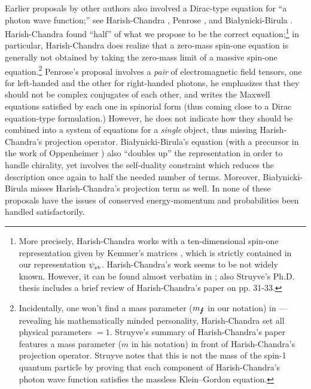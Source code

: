\documentclass[12pt]{article}
\theoremstyle{definition}
\numberwithin{equation}{section}
\newcommand{\psiPH}{{\psi_{\mbox{\rm\tiny ph}}}}
\newcommand{\mPH}{{m_{\mbox{\Lightning}}}}
\begin{document}
 Earlier proposals by other authors also involved a Dirac-type equation for ``a photon wave function;'' 
see Harish-Chandra \cite{HC1946}, Penrose \cite{Pen1976}, and Bia{\l}ynicki-Birula \cite{BiBiTHREE,IBBphotonREV}. 
 Harish-Chandra \cite{HC1946} found ``half'' of what we propose to be the correct equation;\footnote{More precisely, 
  Harish-Chandra works with a ten-dimensional spin-one representation given by Kemmer's matrices \cite{Kem1939}, 
  which is strictly contained in our representation $\psiPH$.
  Harish-Chandra's work seems to be not widely known.
  However, it can be found almost verbatim in \cite{Cor1953};
  also Struyve's Ph.D. thesis \cite{StruyvePHD} includes a brief review of Harish-Chandra's paper on pp. 31-33.}
in particular, Harish-Chandra does realize that a zero-mass spin-one equation is generally not obtained by taking the zero-mass limit of
a massive spin-one equation.\footnote{\label{fn:mzapp}Incidentally, one won't find a mass parameter ($\mPH$ in our notation) in \cite{HC1946} --- 
revealing his mathematically minded personality, Harish-Chandra set all physical parameters $=1$. 
  Struyve's summary of Harish-Chandra's paper features a mass parameter ($m$ in his notation) in front of Harish-Chandra's projection operator.
  Struyve notes that this is not the mass of the spin-1 quantum particle by proving that each component of Harish-Chandra's photon wave function 
 satisfies the massless Klein--Gordon equation.}
Penrose's proposal \cite{Pen1976} involves a {\em pair} of electromagnetic field tensors, one for left-handed and the other 
for right-handed photons, he emphasizes that they should not be complex conjugates of each other, and writes the Maxwell 
equations satisfied by each one in spinorial form (thus coming close to a Dirac equation-type formulation.)  
However, he does not indicate how they should be combined into a system of equations for a {\em single} object, thus
missing Harish-Chandra's projection operator.
 Bia{\l}ynicki-Birula's equation \cite{BiBiTHREE,IBBphotonREV} (with a precursor in the work of Oppenheimer \cite{OppiPHOTON}) also
``doubles up'' the representation in order to handle chirality, yet involves the self-duality constraint which reduces the description 
once again to half the needed number of terms. 
 Moreover, Bia{\l}ynicki-Birula misses Harish-Chandra's projection term as well.
 In none of these proposals have the issues of conserved energy-momentum and probabilities been handled satisfactorily.
 
\end{document}
